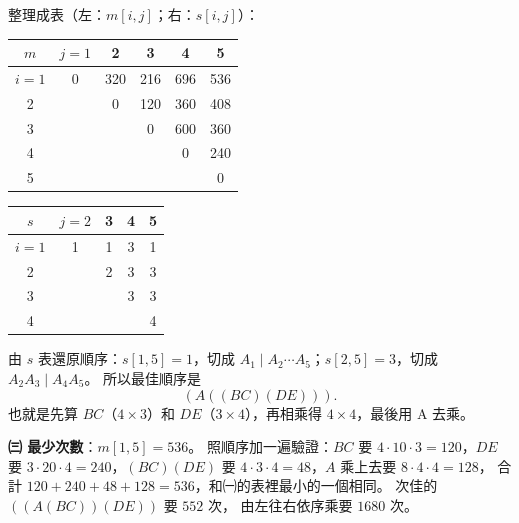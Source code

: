 \begin{pastsoln}
整理成表（左：$m[i,j]$；右：$s[i,j]$）：
\begin{center}
\small
\begin{tabular}{c|ccccc}
$m$ & $j=1$ & 2 & 3 & 4 & 5 \\
\hline
$i=1$ & 0 & 320 & 216 & 696 & 536 \\
2 & & 0 & 120 & 360 & 408 \\
3 & & & 0 & 600 & 360 \\
4 & & & & 0 & 240 \\
5 & & & & & 0 \\
\end{tabular}
\qquad
\begin{tabular}{c|cccc}
$s$ & $j=2$ & 3 & 4 & 5 \\
\hline
$i=1$ & 1 & 1 & 3 & 1 \\
2 & & 2 & 3 & 3 \\
3 & & & 3 & 3 \\
4 & & & & 4 \\
\end{tabular}
\end{center}
由 $s$ 表還原順序：$s[1,5] = 1$，切成 $A_1 \mid A_2 \cdots A_5$；$s[2,5] = 3$，切成
$A_2 A_3 \mid A_4 A_5$。 所以最佳順序是
\[
(A((BC)(DE))) .
\]
也就是先算 $BC$（$4 \times 3$）和 $DE$（$3 \times 4$），再相乘得 $4 \times 4$，最後用 A 去乘。

\textbf{㈢ 最少次數}：$m[1,5] = 536$。 照順序加一遍驗證：$BC$ 要 $4 \cdot 10 \cdot 3 = 120$，$DE$ 要
$3 \cdot 20 \cdot 4 = 240$，$(BC)(DE)$ 要 $4 \cdot 3 \cdot 4 = 48$，$A$ 乘上去要 $8 \cdot 4 \cdot 4 = 128$，
合計 $120 + 240 + 48 + 128 = 536$，和㈠的表裡最小的一個相同。 次佳的 $((A(BC))(DE))$ 要 $552$ 次，
由左往右依序乘要 $1680$ 次。
\end{pastsoln}
